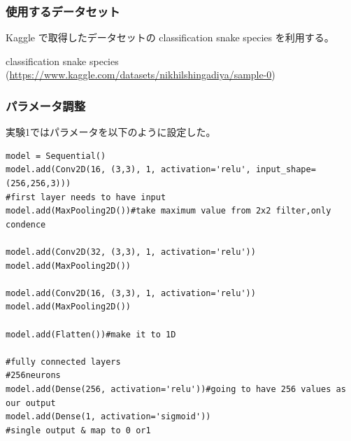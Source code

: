 \documentclass[a4paper, 11pt, titlepage]{jsarticle}
\begin{document}
\subsubsection{使用するデータセット}
Kaggle で取得したデータセットの classification snake species を利用する。\par
classification snake species (\url{https://www.kaggle.com/datasets/nikhilshingadiya/sample-0})

\subsubsection{パラメータ調整}
実験1ではパラメータを以下のように設定した。\par

\begin{lstlisting}[caption=パラメータ(実験1),label=fuga]
model = Sequential()
model.add(Conv2D(16, (3,3), 1, activation='relu', input_shape=(256,256,3))) 
#first layer needs to have input
model.add(MaxPooling2D())#take maximum value from 2x2 filter,only condence 

model.add(Conv2D(32, (3,3), 1, activation='relu'))
model.add(MaxPooling2D())

model.add(Conv2D(16, (3,3), 1, activation='relu'))
model.add(MaxPooling2D())

model.add(Flatten())#make it to 1D

#fully connected layers
#256neurons
model.add(Dense(256, activation='relu'))#going to have 256 values as our output
model.add(Dense(1, activation='sigmoid'))
#single output & map to 0 or1
\end{lstlisting}
\end{document}
